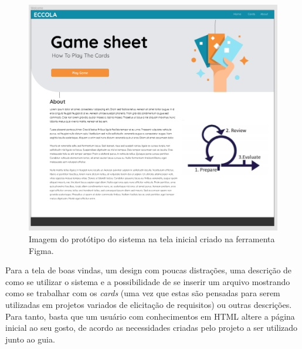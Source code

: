 \begin{figure}[h!]
    \centering
    \includegraphics[width=\textwidth]{img/figma_welcome.png}
    \caption{Imagem do protótipo do sistema na tela inicial criado na ferramenta Figma.}
    \label{fig:figma_welcome}
\end{figure}

Para a tela de boas vindas, um design com poucas distrações, uma descrição de como se utilizar o sistema e a possibilidade de se inserir um arquivo mostrando como se trabalhar com os \textit{cards} (uma vez que estas são pensadas para serem utilizadas em projetos variados de elicitação de requisitos) ou outras descrições. Para tanto, basta que um usuário com conhecimentos em \acrshort{HTML} altere a página inicial ao seu gosto, de acordo as necessidades criadas pelo projeto a ser utilizado junto ao guia.

